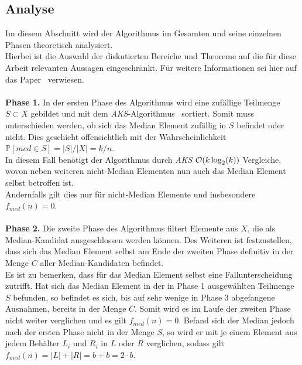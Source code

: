 \subsection{Analyse}	%


\noindent
Im diesem Abschnitt wird der Algorithmus \Rm im Gesamten und seine einzelnen Phasen theoretisch analysiert.\\
Hierbei ist die Auswahl der diskutierten Bereiche und Theoreme auf die für diese Arbeit relevanten Aussagen eingeschränkt. Für weitere Informationen sei hier auf das Paper~\cite{meyer2} verwiesen.\\[.1cm]
\noindent\makebox[\linewidth]{\color{gray}{\hdashrule[0.5ex]{\linewidth}{0.5pt}{1.5mm}}}\\[.05cm]
\noindent
\textbf{Phase 1.} In der ersten Phase des Algorithmus wird eine zufällige Teilmenge $S\subset X$ gebildet und mit dem \textit{AKS}-Algorithmus~\cite{aks} sortiert. Somit muss unterschieden werden, ob sich das Median Element zufällig in $S$ befindet oder nicht. Dies geschieht offensichtlich mit der Wahrscheinlichkeit $\mathbb{P}[med \in S]=|S| / |X| = k/n$.\\[.05cm]
In diesem Fall benötigt der Algorithmus durch \textit{AKS} $\mathcal{O}(k\log_2(k))$ Vergleiche, wovon neben weiteren nicht-Median Elementen nun auch das Median Element selbst betroffen ist.\\
Andernfalls gilt dies nur für nicht-Median Elemente und insbesondere $f_{med}(n)=0$.\\[.1cm]
\noindent\makebox[\linewidth]{\color{gray}{\hdashrule[0.5ex]{\linewidth}{0.5pt}{1.5mm}}}\\[.05cm]
\textbf{Phase 2.} Die zweite Phase des Algorithmus filtert Elemente aus $X$, die als Median-Kandidat ausgeschlossen werden können. Des Weiteren ist festzustellen, dass sich das Median Element selbst am Ende der zweiten Phase definitiv in der Menge $C$ aller Median-Kandidaten befindet.\\
Es ist zu bemerken, dass für das Median Element selbst eine Fallunterscheidung zutrifft. Hat sich das Median Element in der in Phase 1 ausgewählten Teilmenge $S$ befunden, so befindet es sich, bis auf sehr wenige in Phase 3 abgefangene Ausnahmen, bereits in der Menge $C$. Somit wird es im Laufe der zweiten Phase nicht weiter verglichen und es gilt $f_{med}(n)=0$. Befand sich der Median jedoch nach der ersten Phase nicht in der Menge $S$, so wird er mit je einem Element aus jedem Behälter $L_i$ und $R_i$ in $L$ oder $R$ verglichen, sodass gilt $f_{med}(n)=|L| + |R| = b + b = 2\cdot b$.\\[.05cm]

